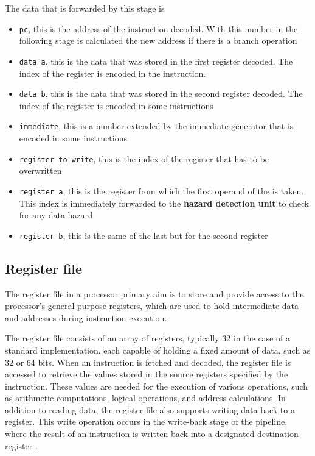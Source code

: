 \documentclass{article}
\begin{document}
The data that is forwarded by this stage is
\begin{itemize}
    \item \texttt{pc}, this is the address of the instruction decoded. With this number in the following stage 
    is calculated the new address if there is a branch operation
    \item \texttt{data a}, this is the data that was stored in the first register decoded. 
    The index of the register is encoded in the instruction.
    \item \texttt{data b}, this is the data that was stored in the second register decoded. 
    The index of the register is encoded in some instructions
    \item \texttt{immediate}, this is a number extended by the immediate generator  that is encoded in some instructions
    \item \texttt{register to write}, this is the index of the register that has to be overwritten
    \item \texttt{register a}, this is the register from which the first operand of the \ALU is taken. 
    This index is immediately forwarded to the \textbf{hazard detection unit}  to check for any data \gls{hazard}
    \item \texttt{register b}, this is the same of the last but for the second register
\end{itemize}

\subsection{Register file}\label{regfile}
The register file in a \RISCV processor primary aim is to store and provide access to the processor's general-purpose registers, 
which are used to hold intermediate data and addresses during instruction execution.

The register file consists of an array of registers, typically 32 in the case of a standard \RISCV implementation, 
each capable of holding a fixed amount of data, such as 32 or 64 bits. 
When an instruction is fetched and decoded, the register file is accessed to retrieve 
the values stored in the source registers specified by the instruction. 
These values are needed for the execution of various operations, such as arithmetic computations, 
logical operations, and address calculations. In addition to reading data, the register file also supports writing data back to a register. 
This write operation occurs in the write-back stage  of the pipeline, 
where the result of an instruction is written back into a designated destination register \cite{chatgpt}.
\end{document}
